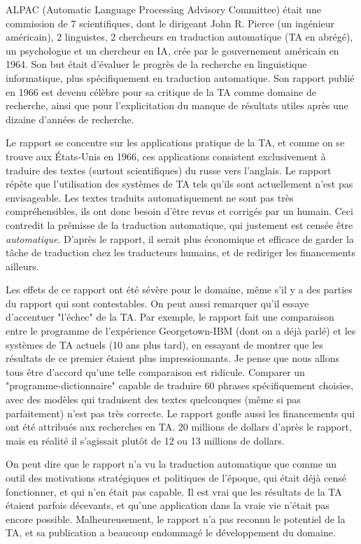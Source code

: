 \documentclass[11pt, a4paper]{report}
\begin{document}
  ALPAC (Automatic Language Processing Advisory Committee) était une commission de 7 scientifiques, 
  dont le dirigeant John R. Pierce (un ingénieur américain), 2 linguistes, 2 chercheurs en traduction 
  automatique (TA en abrégé), un psychologue et un chercheur en IA, 
  crée par le gouvernement américain en 1964. Son but était d'évaluer le progrès de la 
  recherche en linguistique informatique, plus spécifiquement en traduction automatique. Son rapport 
  publié en 1966 est devenu célèbre pour sa critique de la TA comme domaine de recherche, 
  ainsi que pour l'explicitation du manque de résultats utiles après une dizaine d'années de recherche. 

  Le rapport se concentre sur les applications pratique de la TA, et comme on se trouve aux 
  États-Unis en 1966, ces applications consistent exclusivement à traduire des textes 
  (surtout scientifiques) du russe vers l'anglais. Le rapport répète que l'utilisation des 
  systèmes de TA tels qu'ils sont actuellement n'est pas envisageable. Les textes traduits 
  automatiquement ne sont pas très compréhensibles, ils ont donc besoin d'être revus et 
  corrigés par un humain. Ceci contredit la prémisse de la traduction automatique, qui justement est
  censée être \textit{automatique}. D'après le rapport, il serait plus économique et efficace 
  de garder la tâche de traduction chez les traducteurs humains, et de rediriger les financements 
  ailleurs. 

  Les effets de ce rapport ont été sévère pour le domaine, même s'il y a des parties du rapport qui sont 
  contestables. On peut aussi remarquer qu'il essaye d'accentuer "l'échec" de la TA. 
  Par exemple, le rapport fait une comparaison entre le programme de l'expérience Georgetown-IBM 
  (dont on a déjà parlé) et les systèmes de TA actuels (10 ans plus tard), en essayant de montrer que les résultats 
  de ce premier étaient plus impressionnants. Je pense que nous allons tous être 
  d'accord qu'une telle comparaison est ridicule. Comparer un "programme-dictionnaire" capable 
  de traduire 60 phrases spécifiquement choisies, avec des modèles qui traduisent des textes 
  quelconques (même si pas parfaitement) n'est pas très correcte. Le rapport gonfle aussi les 
  financements qui ont été attribués aux recherches en TA. 20 millions de dollars d'après le rapport, mais en réalité 
  il s'agissait plutôt de 12 ou 13 millions de dollars. 
  
  On peut dire que le rapport n'a vu la traduction automatique que comme un outil des 
  motivations stratégiques et politiques de l'époque, qui était 
  déjà censé fonctionner, et qui n'en était pas capable. Il est vrai que les résultats 
  de la TA étaient parfois décevants, et qu'une application dans la vraie vie n'était pas encore possible. 
  Malheureusement, le rapport n'a pas reconnu le potentiel de la TA, et sa publication 
  a beaucoup endommagé le développement du domaine.   
\end{document}
